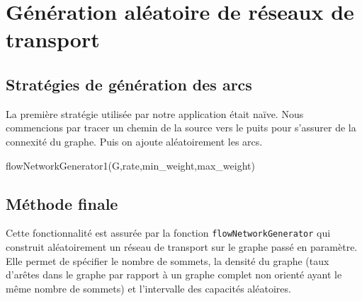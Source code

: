 \section{Génération aléatoire de réseaux de transport}

\subsection{Stratégies de génération des arcs}

La première stratégie utilisée par notre application était naïve. Nous commencions par tracer un chemin de la source vers le puits pour s'assurer de la connexité du graphe. Puis on ajoute aléatoirement les arcs.

\begin{algorithm}[H]
  \caption{flowNetworkGenerator1(G,rate,min\_weight,max\_weight)}
\end{algorithm}

\subsection{Méthode finale}
Cette fonctionnalité est assurée par la fonction \texttt{flowNetworkGenerator} qui construit aléatoirement un réseau de transport sur le graphe passé en paramètre. Elle permet de spécifier le nombre de sommets, la densité du graphe (taux d'arêtes dans le graphe par rapport à un graphe complet non orienté ayant le même nombre de sommets) et l'intervalle des capacités aléatoires.

